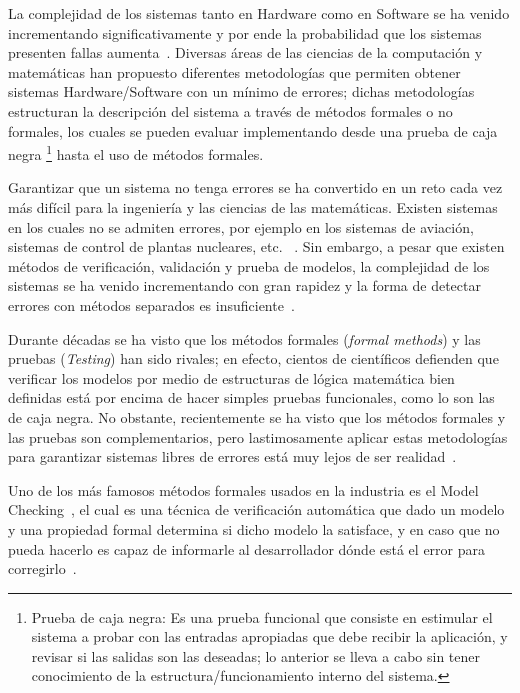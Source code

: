 

\noindent La complejidad de los sistemas tanto en Hardware como en Software se 
ha venido  incrementando significativamente y por ende la probabilidad que los 
sistemas presenten fallas aumenta~\cite{Schneider2004}. Diversas \'areas de 
las ciencias de la computaci\'on y matem\'aticas han propuesto diferentes 
metodolog\'ias que permiten obtener sistemas Hardware/Software con un m\'inimo 
de errores; dichas metodolog\'ias estructuran la descripci\'on del sistema a 
trav\'es de m\'etodos formales o no formales, los cuales se pueden evaluar 
implementando desde una prueba de caja negra \footnote{Prueba de caja negra: Es 
una prueba funcional que consiste en estimular el sistema a probar con las 
entradas apropiadas que debe recibir la aplicaci\'on, y revisar si las salidas 
son las deseadas; lo anterior se lleva a cabo sin tener conocimiento de la 
estructura/funcionamiento interno del sistema.} hasta el uso de m\'etodos 
formales.

Garantizar que un sistema no tenga errores se ha convertido en un reto cada vez 
m\'as dif\'icil para la ingenier\'ia y las ciencias de las matem\'aticas. 
Existen sistemas en los cuales no se admiten errores, por ejemplo en los 
sistemas de aviaci\'on, sistemas de control de plantas nucleares, etc. 
~\cite{Bowen2000}. Sin embargo, a pesar que existen m\'etodos de 
verificaci\'on, validaci\'on y prueba de modelos, la complejidad de los sistemas 
se ha venido incrementando con gran rapidez y la forma de detectar errores con 
m\'etodos separados es insuficiente~\cite{Bowen2002}. 

Durante d\'ecadas se ha visto que los m\'etodos formales (\textit{formal 
methods}) y las pruebas  (\textit{Testing})  han sido rivales;  en efecto, 
cientos de cient\'ificos defienden que verificar los modelos por medio de 
estructuras de l\'ogica matem\'atica bien definidas est\'a por encima de hacer 
simples pruebas funcionales, como lo son las de caja negra.  No obstante, 
recientemente se ha visto que los m\'etodos formales y las pruebas son 
complementarios, pero lastimosamente aplicar estas metodolog\'ias para 
garantizar sistemas libres de errores est\'a muy lejos de ser realidad~\cite{Bowen2002, Gaudel1996, Hierons2009}. 

Uno de los m\'as famosos m\'etodos formales usados en la industria es el Model 
Checking~\cite{Mikovski2009}, el cual es una t\'ecnica de verificaci\'on 
autom\'atica que dado un modelo y una propiedad formal determina si dicho modelo 
la satisface, y en caso que no pueda hacerlo es capaz de informarle al 
desarrollador d\'onde est\'a el error para corregirlo~\cite{Arias2012, 
Mikovski2009}. 

